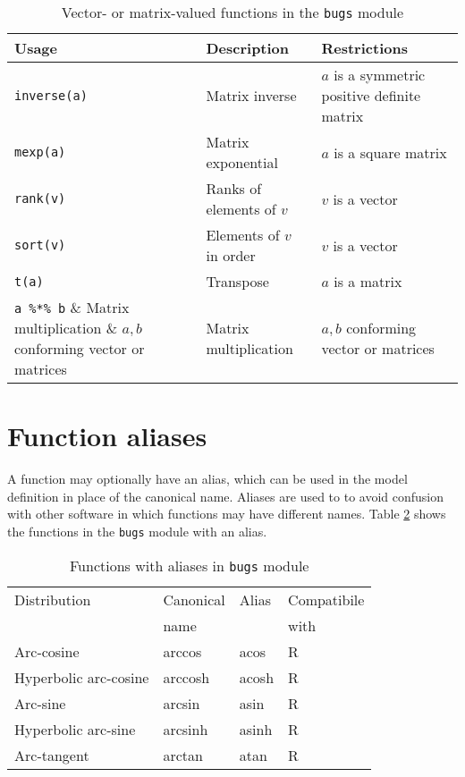 \documentclass[11pt, a4paper, titlepage]{report}
\begin{document}
\begin{table}
\begin{center}
\begin{tabular}{lll}
\hline
Usage & Description & Restrictions \\
\hline
\verb+inverse(a)+ & Matrix inverse & $a$ is a symmetric positive definite matrix  \\
\verb+mexp(a)+ & Matrix exponential & $a$ is a square matrix \\
\verb+rank(v)+ & Ranks of elements of $v$ & $v$ is a vector   \\
\verb+sort(v)+ & Elements of $v$ in order & $v$ is a vector  \\
\verb+t(a)+    & Transpose                & $a$ is a matrix \\
\verb+a %*% b+  & Matrix multiplication & $a,b$ conforming vector or matrices\\

\hline
\end{tabular}
\caption{Vector- or matrix-valued functions in the \texttt{bugs}
  module \label{table:bugs:vector}}
\end{center}
\end{table}

\section{Function aliases}

A function may optionally have an alias, which can be used in the
model definition in place of the canonical name. Aliases are used to
to avoid confusion with other software in which functions may have
different names. Table \ref{table:bugs:functions:alias} shows the
functions in the \texttt{bugs} module with an alias.

\begin{table}
\begin{center}
\begin{tabular}{llll}
\hline
Distribution           & Canonical & Alias & Compatibile  \\
                       & name      &       & with         \\
\hline
Arc-cosine             & arccos    & acos  & R \\
Hyperbolic arc-cosine  & arccosh   & acosh & R \\
Arc-sine               & arcsin    & asin  & R \\
Hyperbolic arc-sine    & arcsinh   & asinh & R \\
Arc-tangent            & arctan    & atan  & R \\
\hline
\end{tabular}
\caption{Functions with aliases in \texttt{bugs} module
  \label{table:bugs:functions:alias}}
\end{center}
\end{table}
\end{document}

